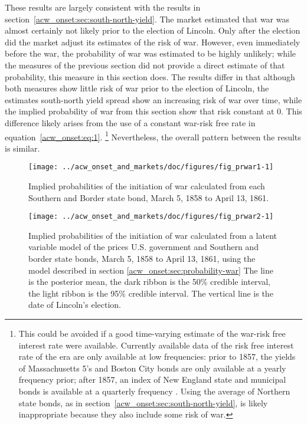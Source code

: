 These results are largely consistent with the results in section~\ref{acw_onset:sec:south-north-yield}.
The market estimated that war was almost certainly not likely prior to the election of Lincoln.
Only after the election did the market adjust its estimates of the risk of war.
However, even immediately before the war, the probability of war was estimated to be highly unlikely; while the measures of the previous section did not provide a direct estimate of that probability, this measure in this section does.
The results differ in that although both measures show little risk of war prior to the election of Lincoln, the estimates south-north yield spread show an increasing risk of war over time, while the implied probability of war from this section show that risk constant at 0.
This difference likely arises from the use of a constant war-risk free rate in equation~\eqref{acw_onset:eq:1}.%
\footnote{This could be avoided if a good time-varying estimate of the war-risk free interest rate were available.
  Currently available data of the risk free interest rate of the era are only available at low frequencies: prior to 1857, the yields of Massachusetts 5's and Boston City bonds are only available at a yearly frequency prior; after 1857, an index of New England state and municipal bonds is available at a quarterly frequency \parencite{Officer2003}.
  Using the average of Northern state bonds, as in section~\ref{acw_onset:sec:south-north-yield}, is likely inappropriate because they also include some risk of war.
}
Nevertheless, the overall pattern between the results is similar.

\begin{figure}
  \centering
  \texttt{[image: ../acw\_onset\_and\_markets/doc/figures/fig\_prwar1-1]}
  \caption[Implied probabilities of war initiation from each Southern and Border state bond]{Implied probabilities of the initiation of war calculated from each Southern and Border state bond, March  5, 1858 to April 13, 1861.}
  \label{acw_onset:fig:prwar1}
\end{figure}

\begin{figure}
  \centering
  \texttt{[image: ../acw\_onset\_and\_markets/doc/figures/fig\_prwar2-1]}
  \caption[Implied probabilities of war initiation calculated from a latent variable model]{
    Implied probabilities of the initiation of war calculated from a latent variable model of the prices U.S. government and Southern and border state bonds, March  5, 1858 to April 13, 1861, using the model described in section \ref{acw_onset:sec:probability-war}
    The line is the posterior mean, the dark ribbon is the 50\% credible interval, the light ribbon is the 95\% credible interval.
    The vertical line is the date of Lincoln's election.
  }
  \label{acw_onset:fig:prwar2}
\end{figure}

